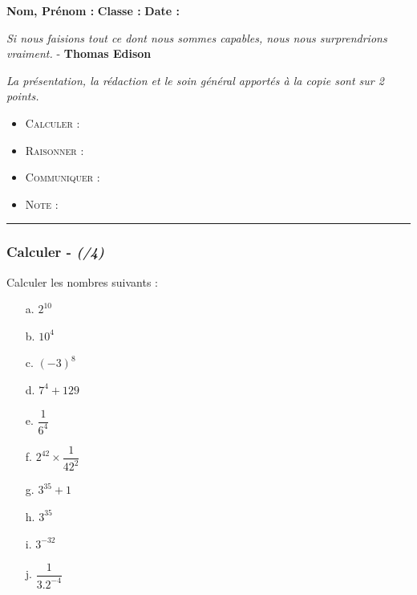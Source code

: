 \documentclass[11pt]{article}
\newcommand{\horrule}[1]{\rule{\linewidth}{#1}} %
\begin{document}
\textbf{Nom, Prénom :} \hspace{8cm} \textbf{Classe :} \hspace{3cm} \textbf{Date :}\\


\begin{center}
  \textit{Si nous faisions tout ce dont nous sommes capables, nous nous surprendrions vraiment.}  - \textbf{Thomas Edison}
\end{center}

\textit{La présentation, la rédaction et le soin général apportés à la copie sont sur 2 points.}
\begin{itemize}
\item \textsc{Calculer} : 
\item \textsc{Raisonner} : 
\item \textsc{Communiquer} : 
\item \textsc{Note} : 
\end{itemize}

\horrule{1px}
\vspace{-1cm}

\subsubsection*{Calculer - \textit{(/4)}}
\begin{multicols}{2}
Calculer les nombres suivants :\\
\begin{enumerate}
  \item[a.] $ 2^{10} $
  \item[b.] $ 10^4 $ 
  \item[c.] $ (-3)^8 $
  \item[d.] $ 7^4 + 129 $
  \item[e.] $ \dfrac{1}{6^4} $
  \item[f.] $ 2^{42} \times \dfrac{1}{42^2} $
  \item[g.] $ 3^{35} + 1$
  \item[h.] $ 3^{35}$
  \item[i.] $ 3^{-32}$
  \item[j.] $ \dfrac{1}{3.2^{-4}}$
\end{enumerate}
\end{multicols}
\end{document}
